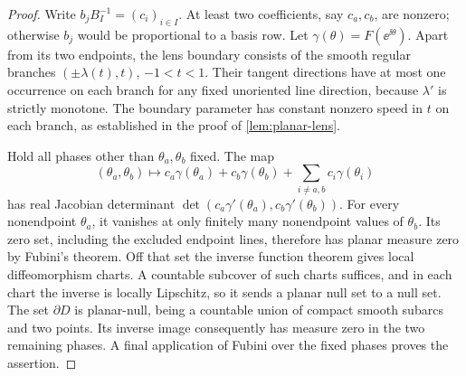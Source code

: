 \begin{proof}
Write $b_jB_I^{-1}=(c_i)_{i\in I}$. At least two coefficients, say $c_a,c_b$, are nonzero; otherwise $b_j$ would be proportional to a basis row. Let $\gamma(\theta)=F(\ee^{\ii\theta})$. Apart from its two endpoints, the lens boundary consists of the smooth regular branches $(\pm\lambda(t),t)$, $-1<t<1$. Their tangent directions have at most one occurrence on each branch for any fixed unoriented line direction, because $\lambda'$ is strictly monotone. The boundary parameter has constant nonzero speed in $t$ on each branch, as established in the proof of \cref{lem:planar-lens}.

Hold all phases other than $\theta_a,\theta_b$ fixed. The map
\[
 (\theta_a,\theta_b)\longmapsto
   c_a\gamma(\theta_a)+c_b\gamma(\theta_b)
       +\sum_{i\ne a,b}c_i\gamma(\theta_i)
\]
has real Jacobian determinant $\det(c_a\gamma'(\theta_a),c_b\gamma'(\theta_b))$. For every nonendpoint $\theta_a$, it vanishes at only finitely many nonendpoint values of $\theta_b$. Its zero set, including the excluded endpoint lines, therefore has planar measure zero by Fubini's theorem. Off that set the inverse function theorem gives local diffeomorphism charts. A countable subcover of such charts suffices, and in each chart the inverse is locally Lipschitz, so it sends a planar null set to a null set. The set $\partial D$ is planar-null, being a countable union of compact smooth subarcs and two points. Its inverse image consequently has measure zero in the two remaining phases. A final application of Fubini over the fixed phases proves the assertion.
\end{proof}
